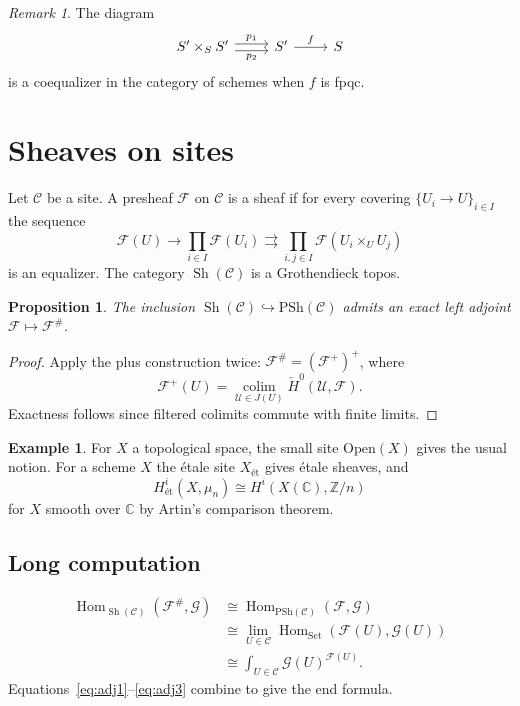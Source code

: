 \documentclass[11pt]{amsart}
\newtheorem{proposition}[theorem]{Proposition}
\theoremstyle{definition}
\newtheorem{example}[theorem]{Example}
\theoremstyle{remark}
\newtheorem{remark}[theorem]{Remark}
\newcommand{\Hom}{\operatorname{Hom}}
\newcommand{\cC}{\mathcal{C}}
\newcommand{\cF}{\mathcal{F}}
\newcommand{\Sh}{\operatorname{Sh}}
\begin{document}
{\begin{remark}
The diagram
\[
\begin{tikzcd}
S'\times_S S' \arrow[r, shift left, "p_1"] \arrow[r, shift right, "p_2"'] & S' \arrow[r, "f"] & S
\end{tikzcd}
\]
is a coequalizer in the category of schemes when $f$ is fpqc.
\end{remark}

\section{Sheaves on sites}\label{sec:sites}
Let $\cC$ be a site. A presheaf $\cF$ on $\cC$ is a sheaf if for every
covering $\{U_i\to U\}_{i\in I}$ the sequence
\[
\cF(U)\to\prod_{i\in I}\cF(U_i)\rightrightarrows\prod_{i,j\in I}\cF(U_i\times_U U_j)
\]
is an equalizer. The category $\Sh(\cC)$ is a Grothendieck topos.

\begin{proposition}\label{prop:sheafification}
The inclusion $\Sh(\cC)\hookrightarrow\mathrm{PSh}(\cC)$ admits an exact left
adjoint $\cF\mapsto\cF^{\#}$.
\end{proposition}

\begin{proof}
Apply the plus construction twice: $\cF^{\#}=(\cF^+)^+$, where
\[
\cF^+(U)=\operatorname*{colim}_{\mathcal{U}\in J(U)}\check{H}^0(\mathcal{U},\cF).
\]
Exactness follows since filtered colimits commute with finite limits.
\end{proof}

\begin{example}
For $X$ a topological space, the small site $\mathrm{Open}(X)$ gives the
usual notion. For a scheme $X$ the étale site $X_{\text{ét}}$ gives
étale sheaves, and
\[
H^i_{\text{ét}}(X,\mu_n)\cong H^i(X(\mathbb{C}),\mathbb{Z}/n)
\]
for $X$ smooth over $\mathbb{C}$ by Artin's comparison theorem.
\end{example}

\subsection{Long computation}
\begin{align}
\Hom_{\Sh(\cC)}(\cF^{\#},\mathcal{G})
&\cong \Hom_{\mathrm{PSh}(\cC)}(\cF,\mathcal{G}) \label{eq:adj1}\\
&\cong \lim_{U\in\cC}\Hom_{\mathrm{Set}}(\cF(U),\mathcal{G}(U)) \label{eq:adj2}\\
&\cong \int_{U\in\cC}\mathcal{G}(U)^{\cF(U)}. \label{eq:adj3}
\end{align}
Equations~\eqref{eq:adj1}--\eqref{eq:adj3} combine to give the end formula.

}
\end{document}
